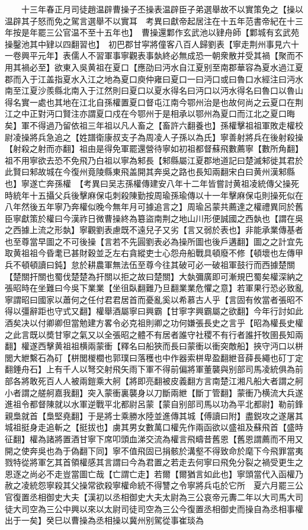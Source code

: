 　　十三年春正月司徒趙温辟曹操子丕操表温辟臣子弟選舉故不以實策免之【操以温辟其子怒而免之駕言選舉不以實耳　考異曰獻帝起居注在十五年范書帝紀在十三年按是年罷三公官温不至十五年也】　曹操還鄴作玄武池以肄舟師【鄴城有玄武苑操鑿池其中肄以四翻習也】　初巴郡甘寜將僮客八百人歸劉表【寧走荆州事見六十一卷興平元年】表儒人不習軍事寧觀表事埶終必無成恐一朝衆散并受其禍【聚而不用其禍必至】欲東入吳黄祖在夏口【應劭曰沔水自江夏别至南郡華容為夏水過江夏郡而入于江盖指夏水入江之地為夏口庾仲雍曰夏口一曰沔口或曰魯口水經注曰沔水南至江夏沙羨縣北南入于江然則曰夏口以夏水得名曰沔口以沔水得名曰魯口以魯山得名實一處也其地在江北自孫權置夏口督屯江南今鄂州治是也故何尚之云夏口在荆江之中正對沔口賢注亦謂夏口戍在今鄂州于是相承以鄂州為夏口而江北之夏口晦矣】軍不得過乃留依祖三年祖以凡人畜之【畜許六翻養也】孫權擊祖祖軍敗走權校尉凌操將兵急追之【姓譜衛康叔支子為周凌人子孫以為氏】寧善射將兵在後射殺操【射殺之射而亦翻】祖由是得免軍罷還營待寧如初祖都督蘇飛數薦寧【數所角翻】祖不用寧欲去恐不免飛乃白祖以寧為邾長【邾縣屬江夏郡地道記曰楚滅邾徙其君於此賢曰邾故城在今復州竟陵縣東飛盖開其奔吳之路也長知兩翻宋白曰黄州漢邾縣也】寧遂亡奔孫權　【考異曰吴志孫權傳建安八年十二年皆嘗討黄祖凌統傳父操死時統年十五攝父兵後擊麻保屯刺殺陳勤按周瑜孫瑜傳以十一年擊麻保屯則操死似在八年然後五年寧乃奔權似晚今無年月可據追言之】周瑜呂蒙共薦達之權禮異同於舊臣寧獻策於權曰今漢祚日微曹操終為簒盜南荆之地山川形便誠國之西埶也【謂在吳之西據上流之形埶】寧觀劉表慮既不遠兒子又劣【言又弱於表也】非能承業傳基者也至尊當早圖之不可後操【言若不先圓劉表必為操所圖也後戶遘翻】圖之之計宜先取黄祖祖今昏耄已甚財穀並乏左右貪縱吏士心怨舟船戰具頓廢不修【頓壞也左傳甲兵不頓頓讀曰鈍】怠於耕農軍無法伍至尊今往其破可必一破祖軍鼓行而西據楚關【楚關扞關也蜀伐楚楚為扞關以拒之故曰楚關】大埶彌廣即可漸規巴蜀矣權深納之張昭時在坐難曰今吳下業業【坐徂臥翻難乃旦翻業業危懼之意】若軍果行恐必致亂寧謂昭曰國家以蕭何之任付君君居首而憂亂奚以希慕古人乎【言固有攸當者張昭不得以彊辭距也守式又翻】權舉酒屬寧曰興霸【甘寧字興霸屬之欲翻】今年行討如此酒矣决以付卿卿但當勉建方畧令必克祖則卿之功何嫌張長史之言乎【昭為權長史權之此言既以奬甘寧之氣又以全張昭之體不有居者誰守社稷不有行者誰扞牧圉長知兩翻】權遂西擊黄祖祖横兩蒙衝【釋名曰船狹而長曰蒙衝以衝突敵船】挾守沔口以栟閭大紲繫石為矴【栟閭椶櫚也郭璞曰落穫也中作器索栟卑盈翻紲音薛長繩也矴丁定翻錘舟石】上有千人以弩交射飛矢雨下軍不得前偏將軍董襲與别部司馬凌統俱為前部各將敢死百人人被兩鎧乘大舸【將即亮翻被皮義翻方言南楚江湘凡船大者謂之舸小者謂之艖舸嘉我翻】突入蒙衝裏襲身以刀斷兩紲【斷丁管翻】蒙衝乃横流大兵遂進祖令都督陳就以水軍逆戰平北都尉呂蒙【蒙自别部司馬以功為平北都尉】勒前鋒親梟就首【梟堅堯翻】于是將士乘勝水陸並進傳其城【傅讀曰附】盡鋭攻之遂屠其城祖挺身走追斬之【挺拔也】虜其男女數萬口權先作兩函欲以盛祖及蘇飛首【盛時征翻】權為諸將置酒甘寧下席叩頭血涕交流為權言飛疇昔舊恩【舊恩謂薦而不用又開之使奔吳也為于偽翻下同】寧不值飛固已捐骸於溝壑不得致命於麾下今飛罪當夷戮特從將軍乞其首領權感其言謂曰今為君置之若走去何寧曰飛免分裂之禍受更生之恩逐之尚必不走豈當圖亡哉【亡謂亡走】若爾【爾猶言如此也】寧頭當代入函權乃赦之凌統怨寧殺其父操常欲殺寧權命統不得讐之令寧將兵屯於它所　夏六月罷三公官復置丞相御史大夫【漢初以丞相御史大夫太尉為三公哀帝元夀二年以大司馬大司徒大司空為三公中興以來以太尉司徒司空為三公今復置丞相御史而操自為丞相事權出于一矣】癸巳以曹操為丞相操以冀州别駕從事崔琰為